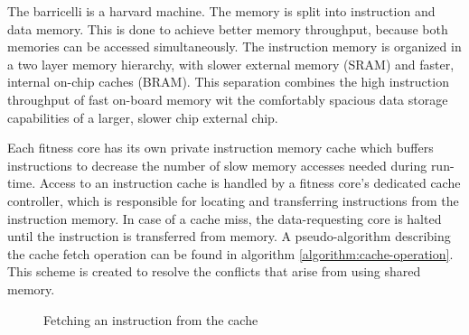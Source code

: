 The \Gls{barricelli} is a \Gls{harvard machine}. \cn
The memory is split into instruction and data memory. 
This is done to achieve better memory throughput, because both memories can be accessed simultaneously.
The instruction memory is organized in a two layer memory hierarchy, with slower external memory (\gls{SRAM}) and faster, internal on-chip caches (\gls{BRAM}).
This separation combines the high instruction throughput of fast on-board memory wit the comfortably spacious data storage capabilities of a larger, slower chip external chip.

Each fitness core has its own private instruction memory cache which buffers instructions to decrease the number of slow memory accesses needed during run-time.
Access to an instruction cache is handled by a fitness core's dedicated cache controller, which is responsible for locating and transferring instructions from the instruction memory.
In case of a cache miss, the data-requesting core is halted until the instruction is transferred from memory.
A pseudo-algorithm describing the cache fetch operation can be found in algorithm \vref{algorithm:cache-operation}.
This scheme is created to resolve the conflicts that arise from using shared memory. 

\begin{figure}[H]
\begin{algorithm}[H]
\SetAlgoLined
\DontPrintSemicolon
{}
\Begin{
    \If{$ a = Ca[A \bmod{512}] $}{
        \Return{$ Ci[A \bmod{512}] $}
    }\Else{
        $ Caa \bmod{512}] \longleftarrow a $\;
        $ Ci[a \bmod{512}] \longleftarrow M[a] $\;
        \Return{$ Ci[A \bmod{512}] $}
    }
}
\caption{Fetching an instruction from the cache}
\label{algorithm:cache-operation}
\end{algorithm}
\end{figure}
